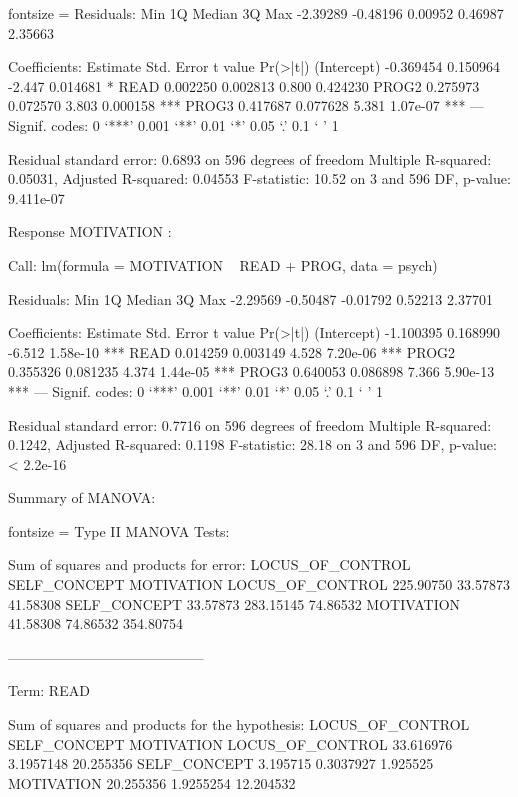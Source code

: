 \documentclass{article}
\begin{document}
\begin{enumerate}[leftmargin = 0 em, label = \arabic*., font = \bfseries]
\begin{enumerate}
\begin{rcode*}{fontsize = \footnotesize}
Residuals:
     Min       1Q   Median       3Q      Max 
-2.39289 -0.48196  0.00952  0.46987  2.35663 

Coefficients:
             Estimate Std. Error t value Pr(>|t|)    
(Intercept) -0.369454   0.150964  -2.447 0.014681 *  
READ         0.002250   0.002813   0.800 0.424230    
PROG2        0.275973   0.072570   3.803 0.000158 ***
PROG3        0.417687   0.077628   5.381 1.07e-07 ***
---
Signif. codes:  0 ‘***’ 0.001 ‘**’ 0.01 ‘*’ 0.05 ‘.’ 0.1 ‘ ’ 1

Residual standard error: 0.6893 on 596 degrees of freedom
Multiple R-squared:  0.05031,	Adjusted R-squared:  0.04553 
F-statistic: 10.52 on 3 and 596 DF,  p-value: 9.411e-07


Response MOTIVATION :

Call:
lm(formula = MOTIVATION ~ READ + PROG, data = psych)

Residuals:
     Min       1Q   Median       3Q      Max 
-2.29569 -0.50487 -0.01792  0.52213  2.37701 

Coefficients:
             Estimate Std. Error t value Pr(>|t|)    
(Intercept) -1.100395   0.168990  -6.512 1.58e-10 ***
READ         0.014259   0.003149   4.528 7.20e-06 ***
PROG2        0.355326   0.081235   4.374 1.44e-05 ***
PROG3        0.640053   0.086898   7.366 5.90e-13 ***
---
Signif. codes:  0 ‘***’ 0.001 ‘**’ 0.01 ‘*’ 0.05 ‘.’ 0.1 ‘ ’ 1

Residual standard error: 0.7716 on 596 degrees of freedom
Multiple R-squared:  0.1242,	Adjusted R-squared:  0.1198 
F-statistic: 28.18 on 3 and 596 DF,  p-value: < 2.2e-16
\end{rcode*}

Summary of MANOVA:
\begin{rcode*}{fontsize = \footnotesize}
Type II MANOVA Tests:

Sum of squares and products for error:
                 LOCUS_OF_CONTROL SELF_CONCEPT MOTIVATION
LOCUS_OF_CONTROL        225.90750     33.57873   41.58308
SELF_CONCEPT             33.57873    283.15145   74.86532
MOTIVATION               41.58308     74.86532  354.80754

------------------------------------------
 
Term: READ 

Sum of squares and products for the hypothesis:
                 LOCUS_OF_CONTROL SELF_CONCEPT MOTIVATION
LOCUS_OF_CONTROL        33.616976    3.1957148  20.255356
SELF_CONCEPT             3.195715    0.3037927   1.925525
MOTIVATION              20.255356    1.9255254  12.204532


\end{rcode*}
\end{enumerate}
\end{enumerate}
\end{document}
